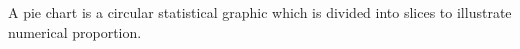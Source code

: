 A pie chart is a circular statistical graphic which is divided into slices 
to illustrate numerical proportion.
